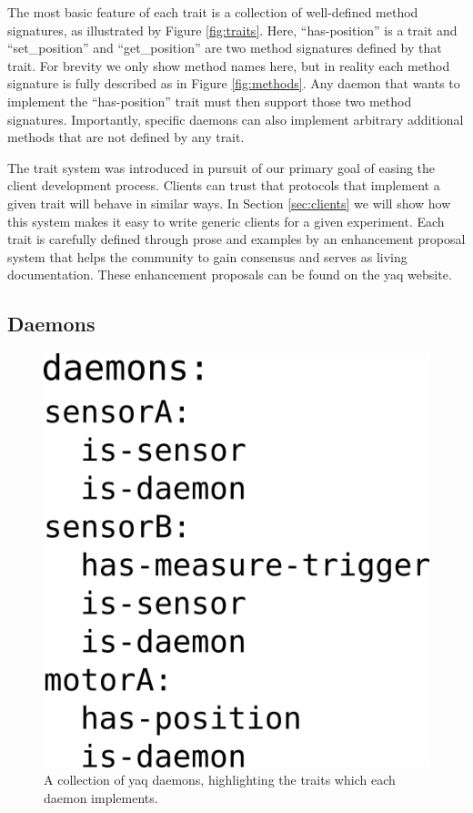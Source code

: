 \documentclass[aip, amsmath, amssymb, reprint,]{revtex4-1}
\begin{document}
The most basic feature of each trait is a collection of well-defined method signatures, as illustrated by Figure \ref{fig:traits}.
Here, ``has-position'' is a trait and ``set\_position'' and ``get\_position'' are two method signatures defined by that trait.
For brevity we only show method names here, but in reality each method signature is fully described as in Figure \ref{fig:methods}.
Any daemon that wants to implement the ``has-position'' trait must then support those two method signatures.
Importantly, specific daemons can also implement arbitrary additional methods that are not defined by any trait.

The trait system was introduced in pursuit of our primary goal of easing the client development process.
Clients can trust that protocols that implement a given trait will behave in similar ways.
In Section \ref{sec:clients} we will show how this system makes it easy to write generic clients for a given experiment.
Each trait is carefully defined through prose and examples by an enhancement proposal system that helps the community to gain consensus and serves as living documentation.
These enhancement proposals can be found on the yaq website.

\subsection{Daemons}

\begin{figure}
  \label{fig:daemons}
  \includegraphics[width=\columnwidth]{./figures/daemons.png}
  \caption{A collection of yaq daemons, highlighting the traits which each daemon implements.}
\end{figure}
\end{document}
